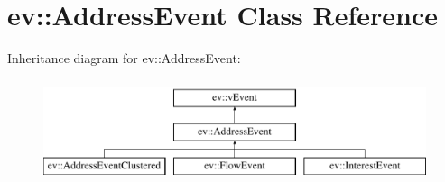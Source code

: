 \hypertarget{classev_1_1AddressEvent}{}\section{ev\+:\+:Address\+Event Class Reference}
\label{classev_1_1AddressEvent}
Inheritance diagram for ev\+:\+:Address\+Event\+:\begin{figure}[H]
\begin{center}
\leavevmode
\includegraphics[height=3.000000cm]{classev_1_1AddressEvent}
\end{center}
\end{figure}
